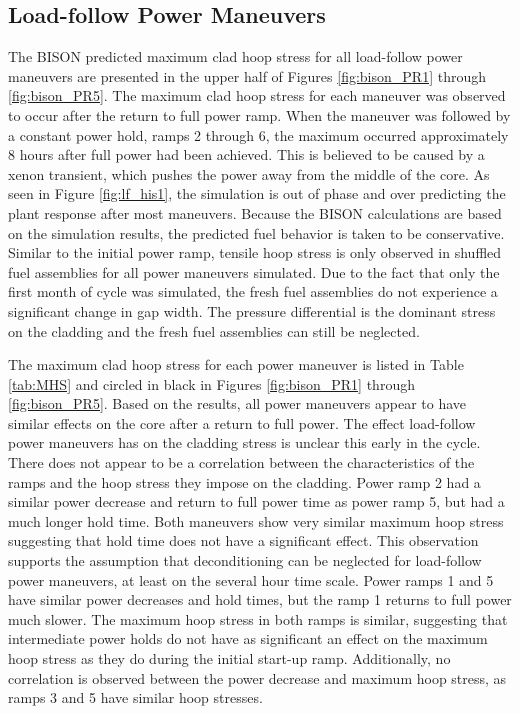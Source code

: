 \documentclass[edeposit,fullpage,11pt]{uiucthesis2009}
\begin{document}
\subsection{Load-follow Power Maneuvers}

The BISON predicted maximum clad hoop stress for all load-follow power maneuvers are presented in the upper half of Figures \ref{fig:bison_PR1} through \ref{fig:bison_PR5}.
The maximum clad hoop stress  for each maneuver was observed to occur after the return to full power ramp.
When the maneuver was followed by a constant power hold, ramps 2 through 6, the maximum occurred approximately 8 hours after full power had been achieved.
This is believed to be caused by a xenon transient, which pushes the power away from the middle of the core.
As seen in Figure \ref{fig:lf_his1}, the simulation is out of phase and over predicting the plant response after most maneuvers.
Because the BISON calculations are based on the simulation results, the predicted fuel behavior is taken to be conservative.
Similar to the initial power ramp, tensile hoop stress is only observed in shuffled fuel assemblies for all power maneuvers simulated.
Due to the fact that only the first month of cycle was simulated, the fresh fuel assemblies do not experience a significant change in gap width.
The pressure differential is the dominant stress on the cladding and the fresh fuel assemblies can still be neglected.

The maximum clad hoop stress for each power maneuver is listed in Table \ref{tab:MHS} and circled in black in Figures \ref{fig:bison_PR1} through \ref{fig:bison_PR5}. 
Based on the results, all power maneuvers appear to have similar effects on the core after a return to full power.
The effect load-follow power maneuvers has on the cladding stress is unclear this early in the cycle.
There does not appear to be a correlation between the characteristics of the ramps and the hoop stress they impose on the cladding.
Power ramp 2 had a similar power decrease and return to full power time as power ramp 5, but had a much longer hold time.
Both maneuvers show very similar maximum hoop stress suggesting that hold time does not have a significant  effect.
This observation supports the assumption that deconditioning can be neglected for load-follow power maneuvers, at least on the several hour time scale.
Power ramps 1 and 5 have similar power decreases and hold times, but the ramp 1 returns to full power much slower.
The maximum hoop stress in both ramps is similar, suggesting that intermediate power holds do not have as significant an effect on the maximum hoop stress as they do during the initial start-up ramp.
Additionally, no correlation is observed between the power decrease and maximum hoop stress, as ramps 3 and 5 have similar hoop stresses.
\end{document}
